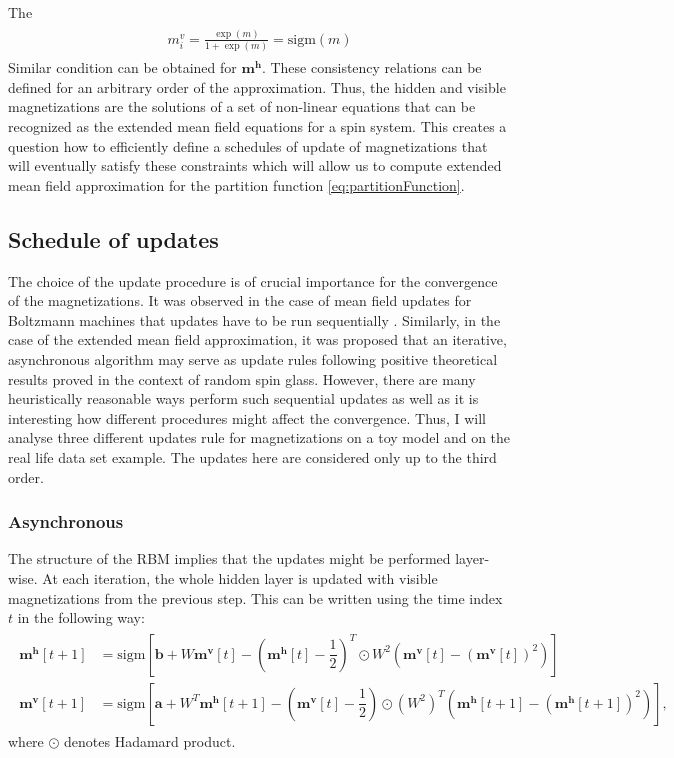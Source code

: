 \documentclass[../report/report.tex]{subfiles}
\begin{document}
The 
\begin{align}
\begin{split} m_i^v = \frac{\exp(m)}{1 + \exp(m)} = \text{sigm}(m)
\end{split}
\label{eq:selfConst}
\end{align}
Similar condition can be obtained for $\mathbf{m}^\mathbf{h}$. These consistency relations can be defined for an arbitrary order of the approximation. Thus, the hidden and visible magnetizations are the solutions of a set of non-linear equations that can be recognized as the extended mean field equations for a spin system. This creates a question how to efficiently define a schedules of update of magnetizations that will eventually satisfy these constraints which will allow us to compute extended mean field approximation for the partition function \ref{eq:partitionFunction}.

\subsection{Schedule of updates}
The choice of the update procedure is of crucial importance for the convergence of the magnetizations. It was observed in the case of mean field updates for Boltzmann machines that updates have to be run sequentially \cite{welling2002new}. Similarly, in the case of the extended mean field approximation, it was proposed that an iterative, asynchronous algorithm may serve as update rules \cite{gabrie2015training} following positive theoretical results proved in the context of random spin glass. However, there are many heuristically reasonable ways perform such sequential updates as well as it is interesting how different procedures might affect the convergence. Thus, I will analyse three different updates rule for magnetizations on a toy model and on the real life data set example. The updates here are considered only up to the third order.

\subsubsection{Asynchronous}
The structure of the RBM implies that the updates might be performed layer-wise. At each iteration, the whole hidden layer is updated with visible magnetizations from the previous step. This can be written using the time index $t$ in the following way: 
\begin{align}
\begin{split}
\mathbf{m}^{\mathbf{h}}[t+1] & = \text{sigm} \left[  \mathbf{b} + W \mathbf{m}^{\mathbf{v}}[t] - \left( \mathbf{m}^{\mathbf{h}}[t] - \dfrac{1}{2}\right)^T \odot W^2 \left( \mathbf{m}^{\mathbf{v}}[t] - ( \mathbf{m}^{\mathbf{v}}[t])^2 \right) \right] \\
\mathbf{m}^{\mathbf{v}}[t+1] & = \text{sigm} \left[  \mathbf{a} + W^T \mathbf{m}^{\mathbf{h}}[t + 1] -\left( \mathbf{m}^{\mathbf{v}}[t] - \dfrac{1}{2}\right) \odot (W^2)^T  \left(\mathbf{m}^{\mathbf{h}}[t+1] - (\mathbf{m}^{\mathbf{h}}[t+1])^2 \right) \right],
\label{eq:asynch}
\end{split}
\end{align}
where $\odot$ denotes Hadamard product. 
\end{document}
